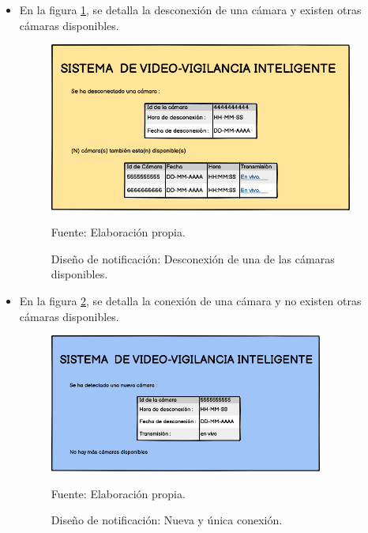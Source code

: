 \begin{itemize}
    \item En la figura \ref{fig:desing_cam_disconn_more_cams}, se detalla la desconexión de una cámara y existen otras cámaras disponibles.
    \begin{figure}[H]
        \begin{center}
            \includegraphics[width=10cm]{img/capitulo_4/cam_disconnected_more_cams.png}
        \end{center}
        \begin{center}
            \caption{Diseño de notificación: Desconexión de una de las cámaras disponibles.}
            Fuente: Elaboración propia.
            \label{fig:desing_cam_disconn_more_cams}
        \end{center}
    \end{figure}
    
    \item En la figura \ref{fig:desing_cam_disconn_no_more_cams}, se detalla la conexión de una cámara y no existen otras cámaras disponibles.
    \begin{figure}[H]
        \begin{center}
            \includegraphics[width=9cm]{img/capitulo_4/cam_disconnected_no_more_cams.png}
        \end{center}
        \begin{center}
            \caption{Diseño de notificación: Nueva y única conexión.}
            Fuente: Elaboración propia.
            \label{fig:desing_cam_disconn_no_more_cams}
        \end{center}
    \end{figure}    


\end{itemize}
